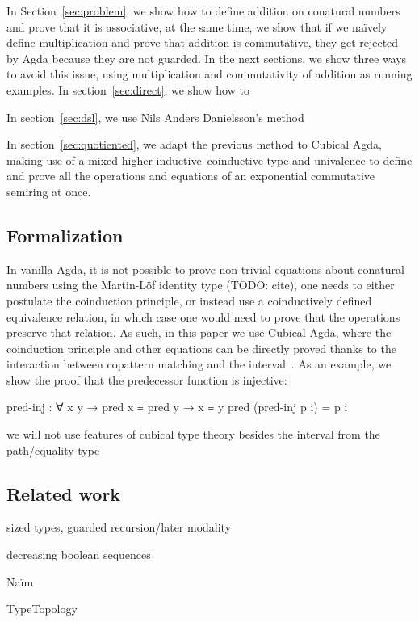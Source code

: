 In Section~\ref{sec:problem}, we show how to define addition on conatural
numbers and prove that it is associative, at the same time, we show that if we
naïvely define multiplication and prove that addition is commutative, they get
rejected by Agda because they are not guarded. In the next sections, we show
three ways to avoid this issue, using multiplication and commutativity of
addition as running examples. In section~\ref{sec:direct}, we show how to

In section~\ref{sec:dsl}, we use Nils Anders Danielsson's
method~\cite{danielsson-beating}

In section~\ref{sec:quotiented}, we adapt the previous method to Cubical Agda,
making use of a mixed higher-inductive--coinductive type and univalence to
define and prove all the operations and equations of an exponential commutative
semiring at once.

\subsection{Formalization}

In vanilla Agda, it is not possible to prove non-trivial equations about
conatural numbers using the Martin-Löf identity type (TODO: cite), one needs to
either postulate the coinduction principle, or instead use a coinductively
defined equivalence relation, in which case one would need to prove that the
operations preserve that relation. As such, in this paper we use Cubical Agda,
where the coinduction principle and other equations can be directly proved
thanks to the interaction between copattern matching and the
interval~\cite{vezzosi-cubical}. As an example, we show the proof that the
predecessor function is injective:
\begin{code}
pred-inj : ∀ {x y} → pred x ≡ pred y → x ≡ y
pred (pred-inj p i) = p i
\end{code}

we will not use features of cubical type theory besides the interval from the
path/equality type

\subsection{Related work}

sized types, guarded recursion/later modality

decreasing boolean sequences

Naïm~\cite{favier-conat}

TypeTopology

